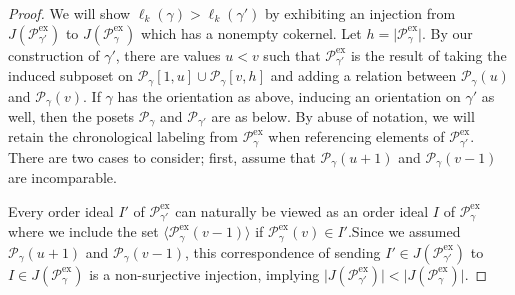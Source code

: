 \documentclass[10pt,a4paper]{amsart}
\newcommand{\calP}{\mathcal{P}}
\newcommand{\exx}{\mathrm{ex}}
\newcommand{\highlight}[1]{\colorbox{gray!15}{\small{#1}}}
\begin{document}
\begin{proof}
We will show $\ell_k(\gamma) > \ell_k(\gamma')$ by exhibiting an injection from $J(\calP_{\gamma'}^\exx)$ to $J(\calP_\gamma^\exx)$ which has a nonempty cokernel. Let $h = \vert \calP_\gamma^\exx \vert$. By our construction of $\gamma'$, there are values $u < v$ such that $\calP_{\gamma'}^\exx$ is the result of taking the induced subposet on $\calP_\gamma[1,u] \cup \calP_\gamma[v,h]$ and adding a relation between $\calP_\gamma(u)$ and $\calP_\gamma(v)$. If $\gamma$ has the orientation as above, inducing an orientation on $\gamma'$ as well, then the posets $\calP_\gamma$ and $\calP_{\gamma'}$ are as below. By abuse of notation, we will retain the chronological labeling from $\calP_\gamma^\exx$ when referencing elements of $\calP_{\gamma'}^\exx$. There are two cases to consider; first, assume that $\calP_\gamma(u+1)$ and $\calP_\gamma(v-1)$ are incomparable. 



\begin{center}
\end{center}


 Every order ideal $I'$ of $\calP_{\gamma'}^\exx$ can naturally be viewed as an order ideal $I$ of $\calP_{\gamma}^\exx$ where we include the set $\langle \calP^\exx_{\gamma}(v-1)\rangle$ if $\calP^\exx_{\gamma}(v) \in I'$.Since we assumed  $\calP_\gamma(u+1)$ and $\calP_\gamma(v-1)$, this correspondence of sending $I' \in J(\calP_{\gamma'}^\exx)$ to $I \in J(\calP_{\gamma}^\exx)$ is a non-surjective injection, implying $\vert J(\calP_{\gamma'}^\exx) \vert < \vert J(\calP_{\gamma}^\exx) \vert$.


\end{proof}
\end{document}
